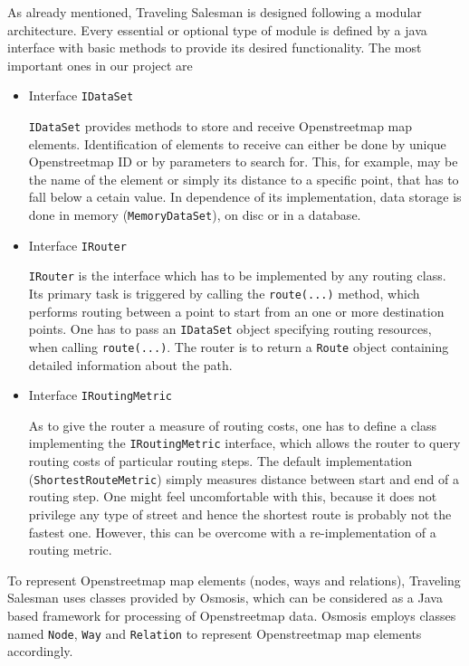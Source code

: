 As already mentioned, Traveling Salesman is designed following a modular architecture. Every essential or optional type of module is defined by a java interface with basic methods to provide its desired functionality. The most important ones in our project are

\begin{itemize}

	\item Interface \texttt{IDataSet}
	
		\texttt{IDataSet} provides methods to store and receive Openstreetmap map elements. Identification of elements to receive can either be done by unique Openstreetmap ID or by parameters to search for. This, for example, may be the name of the element or simply its distance to a specific point, that has to fall below a cetain value.\newline
		 In dependence of its implementation, data storage is done in memory (\texttt{MemoryDataSet}), on disc or in a database.
	
	\item Interface \texttt{IRouter}

		\texttt{IRouter} is the interface which has to be implemented by any routing class. Its primary task is triggered by calling the \texttt{route(...)} method, which performs routing between a point to start from an one or more destination points. One has to pass an \texttt{IDataSet} object specifying routing resources, when calling \texttt{route(...)}. The router is to return a \texttt{Route} object containing detailed information about the path.
	
	\item Interface \texttt{IRoutingMetric}
	
		As to give the router a  measure of routing costs, one has to define a class implementing the \texttt{IRoutingMetric} interface, which allows the router to query routing costs of particular routing steps.\newline
		The default implementation (\texttt{ShortestRouteMetric}) simply measures distance between start and end of a routing step. One might feel uncomfortable with this, because it does not privilege any type of street and hence the shortest route is probably not the fastest one. However, this can be overcome with a re-implementation of a routing metric.
	
\end{itemize}

To represent Openstreetmap map elements (nodes, ways and relations), Traveling Salesman uses classes provided by Osmosis, which can be considered as a Java based framework for processing of Openstreetmap data. Osmosis employs classes named \texttt{Node}, \texttt{Way} and \texttt{Relation} to represent Openstreetmap map elements accordingly. 

